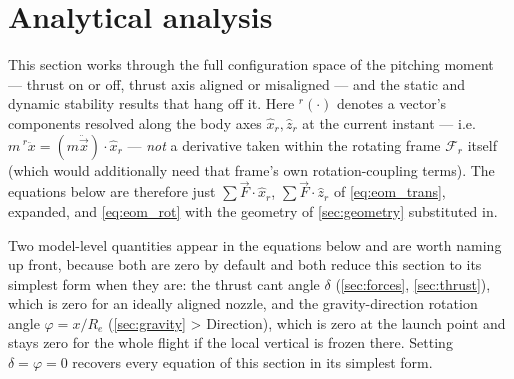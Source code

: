 \section{Analytical analysis}\label{sec:analysis}
This section works through the full configuration space of the pitching moment --- thrust on or
off, thrust axis aligned or misaligned --- and the static and dynamic stability results that hang
off it. Here ${}^r(\cdot)$ denotes a vector's components resolved along the body axes $\hat{x}_r,
\hat{z}_r$ at the current instant --- i.e.\ $m\,{}^r\ddot{x}=(m\ddot{\vec{x}})\cdot\hat{x}_r$ ---
\emph{not} a derivative taken within the rotating frame $\mathcal{F}_r$ itself (which would
additionally need that frame's own rotation-coupling terms). The equations below are therefore
just $\sum\vec{F}\cdot\hat{x}_r$, $\sum\vec{F}\cdot\hat{z}_r$ of \autoref{eq:eom_trans}, expanded,
and \autoref{eq:eom_rot} with the geometry of \autoref{sec:geometry} substituted in.

Two model-level quantities appear in the equations below and are worth naming up front, because
both are zero by default and both reduce this section to its simplest form when they are: the
thrust cant angle $\delta$ (\autoref{sec:forces}, \autoref{sec:thrust}), which is zero for an
ideally aligned nozzle, and the gravity-direction rotation angle $\varphi=x/R_e$
(\autoref{sec:gravity} > Direction), which is zero at the launch point and stays zero for the
whole flight if the local vertical is frozen there. Setting $\delta=\varphi=0$ recovers every
equation of this section in its simplest form.

